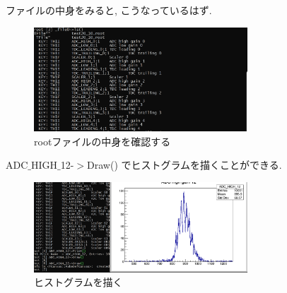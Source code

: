 ファイルの中身をみると, こうなっているはず.

\begin{figure}[h]
  \begin{center}
    \includegraphics[width=8cm]{../SummerChallenge_ls_list.png}
    \caption{rootファイルの中身を確認する}
    \label{fig:ls_ROOT}
  \end{center}
\end{figure}

ADC$\_$HIGH$\_$12-$>$Draw() でヒストグラムを描くことができる.

\begin{figure}[h]
  \begin{center}
    \includegraphics[width=8cm]{../SummerChallenge_draw_adc12.png}
    \caption{ヒストグラムを描く}
    \label{fig:ls_ROOT}
  \end{center}
\end{figure}


